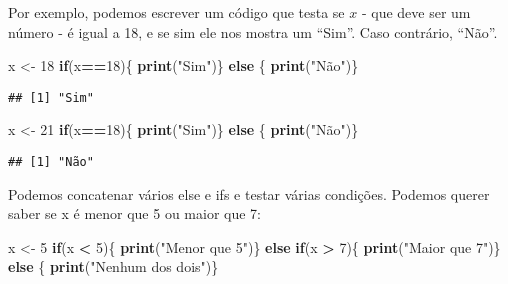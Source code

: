 \documentclass[]{book}
\newenvironment{Shaded}{\begin{snugshade}}{\end{snugshade}}
\newcommand{\KeywordTok}[1]{\textcolor[rgb]{0.13,0.29,0.53}{\textbf{#1}}}
\newcommand{\DecValTok}[1]{\textcolor[rgb]{0.00,0.00,0.81}{#1}}
\newcommand{\StringTok}[1]{\textcolor[rgb]{0.31,0.60,0.02}{#1}}
\newcommand{\ControlFlowTok}[1]{\textcolor[rgb]{0.13,0.29,0.53}{\textbf{#1}}}
\newcommand{\OperatorTok}[1]{\textcolor[rgb]{0.81,0.36,0.00}{\textbf{#1}}}
\newcommand{\NormalTok}[1]{#1}
\begin{document}
Por exemplo, podemos escrever um código que testa se \(x\) - que deve
ser um número - é igual a 18, e se sim ele nos mostra um ``Sim''. Caso
contrário, ``Não''.

\begin{Shaded}
\begin{Highlighting}[]
\NormalTok{x <-}\StringTok{ }\DecValTok{18}
\ControlFlowTok{if}\NormalTok{(x}\OperatorTok{==}\DecValTok{18}\NormalTok{)\{}
    \KeywordTok{print}\NormalTok{(}\StringTok{"Sim"}\NormalTok{)\} }\ControlFlowTok{else}\NormalTok{ \{}
    \KeywordTok{print}\NormalTok{(}\StringTok{"Não"}\NormalTok{)\}}
\end{Highlighting}
\end{Shaded}

\begin{verbatim}
## [1] "Sim"
\end{verbatim}

\begin{Shaded}
\begin{Highlighting}[]
\NormalTok{x <-}\StringTok{ }\DecValTok{21}
\ControlFlowTok{if}\NormalTok{(x}\OperatorTok{==}\DecValTok{18}\NormalTok{)\{}
    \KeywordTok{print}\NormalTok{(}\StringTok{"Sim"}\NormalTok{)\} }\ControlFlowTok{else}\NormalTok{ \{}
    \KeywordTok{print}\NormalTok{(}\StringTok{"Não"}\NormalTok{)\}}
\end{Highlighting}
\end{Shaded}

\begin{verbatim}
## [1] "Não"
\end{verbatim}

Podemos concatenar vários else e ifs e testar várias condições. Podemos
querer saber se x é menor que 5 ou maior que 7:

\begin{Shaded}
\begin{Highlighting}[]
\NormalTok{x <-}\StringTok{ }\DecValTok{5}
\ControlFlowTok{if}\NormalTok{(x }\OperatorTok{<}\StringTok{ }\DecValTok{5}\NormalTok{)\{}
    \KeywordTok{print}\NormalTok{(}\StringTok{"Menor que 5"}\NormalTok{)\} }\ControlFlowTok{else} \ControlFlowTok{if}\NormalTok{(x }\OperatorTok{>}\StringTok{ }\DecValTok{7}\NormalTok{)\{}
    \KeywordTok{print}\NormalTok{(}\StringTok{"Maior que 7"}\NormalTok{)\} }\ControlFlowTok{else}\NormalTok{ \{}
    \KeywordTok{print}\NormalTok{(}\StringTok{"Nenhum dos dois"}\NormalTok{)\}}
\end{Highlighting}
\end{Shaded}
\end{document}
